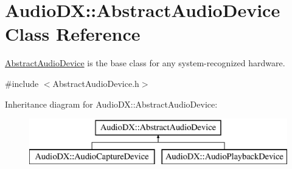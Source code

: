\hypertarget{class_audio_d_x_1_1_abstract_audio_device}{\section{Audio\-D\-X\-:\-:Abstract\-Audio\-Device Class Reference}
\label{class_audio_d_x_1_1_abstract_audio_device}
}


\hyperlink{class_audio_d_x_1_1_abstract_audio_device}{Abstract\-Audio\-Device} is the base class for any system-\/recognized hardware.  




{\ttfamily \#include $<$Abstract\-Audio\-Device.\-h$>$}

Inheritance diagram for Audio\-D\-X\-:\-:Abstract\-Audio\-Device\-:\begin{figure}[H]
\begin{center}
\leavevmode
\includegraphics[height=2.000000cm]{class_audio_d_x_1_1_abstract_audio_device}
\end{center}
\end{figure}
